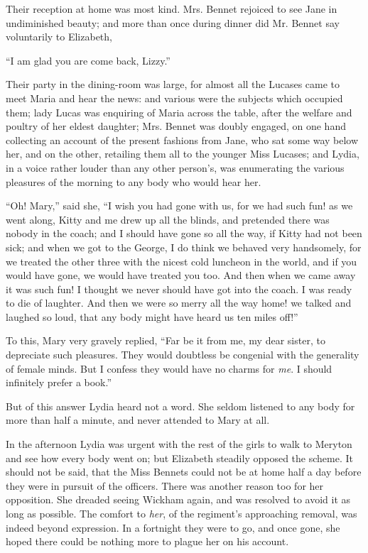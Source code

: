 Their reception at home was most kind. Mrs. Bennet
rejoiced to see Jane in undiminished bea\-uty; and more
than once during dinner did Mr. Bennet say voluntarily
to Elizabeth,

“I am glad you are come back, Lizzy.”

Their party in the dining-room was large, for almost
all the Lucases came to meet Maria and hear the news:
and various were the subjects which occupied them;
lady Lucas was enquiring of Maria across the table, after
the welfare and poultry of her eldest daughter; Mrs. Bennet
was doubly engaged, on one hand collecting an account
of the present fashions from Jane, who sat some way
below her, and on the other, retailing them all to the
younger Miss Lucases; and Lydia, in a voice rather
louder than any other person’s, was enumerating the
various pleasures of the morning to any body who would
hear her.

“Oh! Mary,” said she, “I wish you had gone with
us, for we had such fun! as we went along, Kitty and
me drew up all the blinds, and pretended there was
nobody in the coach; and I should have gone so all the
way, if Kitty had not been sick; and when we got to
the George, I do think we behaved very handsomely, for
we treated the other three with the nicest cold luncheon
in the world, and if you would have gone, we would have
treated you too. And then when we came away it was
such fun! I thought we never should have got into the
coach. I was ready to die of laughter. And then we were
so merry all the way home! we talked and laughed so
loud, that any body might have heard us ten miles off!”

To this, Mary very gravely replied, “Far be it from
me, my dear sister, to depreciate such pleasures. They
would doubtless be congenial with the generality of female
minds. But I confess they would have no charms for \textit{me}.
I should infinitely prefer a book.”

But of this answer Lydia heard not a word. She seldom
listened to any body for more than half a minute, and
never attended to Mary at all.

In the afternoon Lydia was urgent with the rest of the
girls to walk to Meryton and see how every body went on;
but Elizabeth steadily opposed the scheme. It should
not be said, that the Miss Bennets could not be at home
half a day before they were in pursuit of the officers.
There was another reason too for her opposition. She
dreaded seeing Wickham again, and was resolved to avoid
it as long as possible. The comfort to \textit{her}, of the regiment’s
approaching removal, was indeed beyond expression. In
a fortnight they were to go, and once gone, she hoped
there could be nothing more to plague her on his account.

